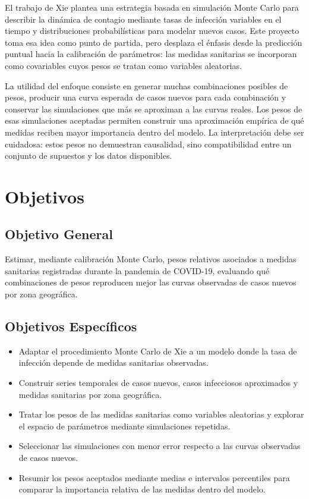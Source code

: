 \documentclass[12pt]{article}
\begin{document}
El trabajo de Xie \cite{Xie2020} plantea una estrategia basada en simulación
Monte Carlo para describir la dinámica de contagio mediante tasas de infección
variables en el tiempo y distribuciones probabilísticas para modelar nuevos
casos. Este proyecto toma esa idea como punto de partida, pero desplaza el
énfasis desde la predicción puntual hacia la calibración de parámetros: las
medidas sanitarias se incorporan como covariables cuyos pesos se tratan como
variables aleatorias.

La utilidad del enfoque consiste en generar muchas combinaciones posibles de
pesos, producir una curva esperada de casos nuevos para cada combinación y
conservar las simulaciones que más se aproximan a las curvas reales. Los pesos
de esas simulaciones aceptadas permiten construir una aproximación empírica de
qué medidas reciben mayor importancia dentro del modelo. La interpretación debe
ser cuidadosa: estos pesos no demuestran causalidad, sino compatibilidad entre
un conjunto de supuestos y los datos disponibles.

\newpage

\section{Objetivos}

\subsection{Objetivo General}

Estimar, mediante calibración Monte Carlo, pesos relativos asociados a medidas
sanitarias registradas durante la pandemia de COVID-19, evaluando qué
combinaciones de pesos reproducen mejor las curvas observadas de casos nuevos
por zona geográfica.

\subsection{Objetivos Específicos}

\begin{itemize}
  \item Adaptar el procedimiento Monte Carlo de Xie \cite{Xie2020} a un modelo
        donde la tasa de infección depende de medidas sanitarias observadas.
  \item Construir series temporales de casos nuevos, casos infecciosos
        aproximados y medidas sanitarias por zona geográfica.
  \item Tratar los pesos de las medidas sanitarias como variables aleatorias y
        explorar el espacio de parámetros mediante simulaciones repetidas.
  \item Seleccionar las simulaciones con menor error respecto a las curvas
        observadas de casos nuevos.
  \item Resumir los pesos aceptados mediante medias e intervalos percentiles
        para comparar la importancia relativa de las medidas dentro del modelo.
\end{itemize}
\end{document}
